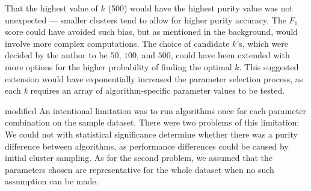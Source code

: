\documentclass[../report.tex]{subfiles}
\begin{document}
That the highest value of $k$ (500) would have the highest purity value was not unexpected --- smaller clusters tend to allow for higher purity accuracy. The $F_1$ score could have avoided such bias, but as mentioned in the background, would involve more complex computations. The choice of candidate $k$'s, which were decided by the author to be $50$, $100$, and $500$, could have been extended with more options for the higher probability of finding the optimal $k$. This suggested extension would have exponentially increased the parameter selection process, as each \textit{k} requires an array of algorithm-specific parameter values to be tested.

\begin{color}{modified}
An intentional limitation was to run algorithms once for each parameter combination on the sample dataset. There were two problems of this limitation: We could not with statistical significance determine whether there was a purity difference between algorithms, as performance differences could be caused by initial cluster sampling. As for the second problem, we assumed that the parameters chosen are representative for the whole dataset when no such assumption can be made.
\end{color}






\end{document}
